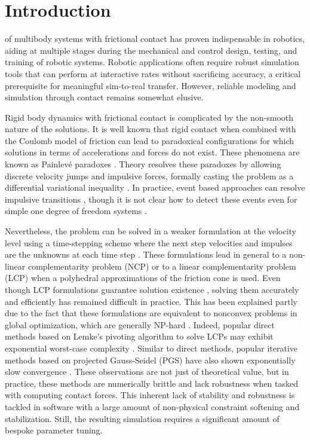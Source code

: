 
\section{Introduction}
\label{sec:introduction}

 of multibody systems with frictional contact has
proven indispensable in robotics, aiding at multiple stages during the
mechanical and control design, testing, and training of robotic systems.
Robotic applications often require robust simulation tools that can perform at
interactive rates without sacrificing accuracy, a critical prerequisite for
meaningful sim-to-real transfer. However, reliable modeling and simulation
through contact remains somewhat elusive.

Rigid body dynamics with frictional contact is complicated by the non-smooth
nature of the solutions. It is well known \cite{bib:baraff1993issues} that rigid
contact when combined with the Coulomb model of friction can lead to paradoxical
configurations for which solutions in terms of accelerations and forces do not
exist. These phenomena are known as Painlev\'e paradoxes
\cite{bib:hogan2017regularization}. Theory resolves these paradoxes by allowing
discrete velocity jumps and impulsive forces, formally casting the problem as a
differential variational inequality \cite{bib:pang2008differential}. In practice,
event based approaches can resolve impulsive transitions \cite{bib:haug1986},
though it is not clear how to detect these events even for simple one degree of
freedom systems \cite{bib:hogan2017regularization}.

Nevertheless, the problem can be solved in a weaker formulation at the velocity
level using a time-stepping scheme where the next step velocities and impulses
are the unknowns at each time
step \cite{bib:stewart1996implicit, bib:anitescu1997}. These formulations lead
in general to a non-linear complementarity problem (NCP) or to a linear
complementarity problem (LCP) when a polyhedral approximations of the friction
cone is used. Even though LCP formulations guarantee solution existence
\cite{bib:anitescu1997, bib:stewart1998convergence}, solving them accurately and
efficiently has remained difficult in practice. This has been explained
partly due to the fact that these formulations are equivalent to nonconvex problems
in global optimization, which are generally NP-hard \cite{bib:Kaufman2008}.
Indeed, popular direct methods based on Lemke's pivoting algorithm to solve
LCPs may exhibit exponential worst-case complexity \cite{bib:baraff1994fast}. Similar
to direct methods, popular iterative methods based on projected
Gauss-Seidel (PGS) \cite{bib:duriez2006_realistic_haptic_rendering, bib:bullet}
have also shown exponentially slow convergence \cite{bib:erleben2007velocity}.
These observations are not just of theoretical value, but in practice,
these methods are numerically brittle and lack robustness when tasked with computing contact forces.
This inherent lack of stability and robustness is tackled in software with a
large amount of non-physical constraint softening and stabilization.
Still, the resulting simulation requires a significant amount of bespoke parameter tuning.

